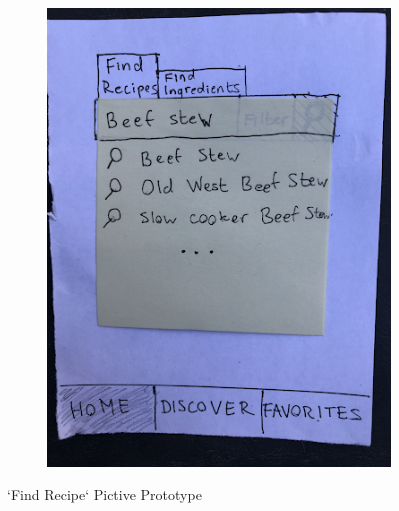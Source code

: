 \documentclass[11pt,english]{article}
\begin{document}
\begin{figure}
\begin{subfigure}[b]{0.4\linewidth}
    \includegraphics[width=\linewidth]{figure8v3.png}
  \end{subfigure}
  \caption{`Find Recipe` Pictive Prototype}
  \label{fig:figure8}
\end{figure}
\end{document}
